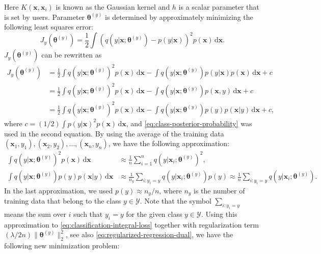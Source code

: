{Here $K(\boldsymbol{x},\boldsymbol{x}_i)$ is known as the Gaussian kernel and $h$ is a scalar parameter that is set by users. Parameter $\boldsymbol{\theta}^{(y)}$ is determined by approximately minimizing the following least squares error:}
\[J_y(\boldsymbol{\theta}^{(y)})=\frac12\int\left(q(y|\boldsymbol{x};\boldsymbol{\theta}^{(y)})-p(y|\boldsymbol{x})\right)^2p(\boldsymbol{x})\,\mathrm d\boldsymbol{x}.\]
{$J_y(\boldsymbol{\theta}^{(y)})$ can be rewritten as}
\begin{equation}\label{eq:classification-integral-loss}
\begin{aligned}
J_y(\boldsymbol{\theta}^{(y)})&=\frac12\int q(y|\boldsymbol{x};\boldsymbol{\theta}^{(y)})^2p(\boldsymbol{x})\,\mathrm d\boldsymbol{x}-\int q(y|\boldsymbol{x};\boldsymbol{\theta}^{(y)})p(y|\boldsymbol{x})p(\boldsymbol{x})\,\mathrm d\boldsymbol{x}+c\\
&=\frac12\int q(y|\boldsymbol{x};\boldsymbol{\theta}^{(y)})^2p(\boldsymbol{x})\,\mathrm d\boldsymbol{x}-\int q(y|\boldsymbol{x};\boldsymbol{\theta}^{(y)})p(\boldsymbol{x},y)\,\mathrm d\boldsymbol{x}+c\\
&=\frac12\int q(y|\boldsymbol{x};\boldsymbol{\theta}^{(y)})^2p(\boldsymbol{x})\,\mathrm d\boldsymbol{x}-\int q(y|\boldsymbol{x};\boldsymbol{\theta}^{(y)})p(y)p(\boldsymbol{x}|y)\,\mathrm d\boldsymbol{x}+c,
\end{aligned}
\end{equation}
{where $c=(1/2)\int p(y|\boldsymbol{x})^2p(\boldsymbol{x})\,\mathrm d\boldsymbol{x}$, and \eqref{eq:class-posterior-probability} was used in the second equation. By using the average of the training data $(\boldsymbol{x}_1,y_1),(\boldsymbol{x}_2,y_2),\ldots,(\boldsymbol{x}_n,y_n)$, we have the following approximation:}
\[\begin{aligned}
\int q(y|\boldsymbol{x};\boldsymbol{\theta}^{(y)})^2p(\boldsymbol{x})\,\mathrm d\boldsymbol{x}&\approx\frac1n\sum_{i=1}^nq(y|\boldsymbol{x}_i;\boldsymbol{\theta}^{(y)})^2,\\
\int q(y|\boldsymbol{x};\boldsymbol{\theta}^{(y)})p(y)p(\boldsymbol{x}|y)\,\mathrm d\boldsymbol{x}&\approx\frac1{n_y}\sum_{i:y_i=y}q(y|\boldsymbol{x}_i;\boldsymbol{\theta}^{(y)})p(y)\approx\frac1n\sum_{i:y_i=y}q(y|\boldsymbol{x}_i;\boldsymbol{\theta}^{(y)}).
\end{aligned}\]
{In the last approximation, we used $p(y)\approx n_y/n$, where $n_y$ is the number of training data that belong to the class $y\in\mathcal{Y}$. Note that the symbol $\sum_{i:y_i=y}$ means the sum over $i$ such that $y_i=y$ for the given class $y\in\mathcal{Y}$. Using this approximation to \eqref{eq:classification-integral-loss} together with regularization term $(\lambda/2n)\|\boldsymbol{\theta}^{(y)}\|_2^2$, see also \eqref{eq:regularized-regression-dual}, we have the following new minimization problem:}
